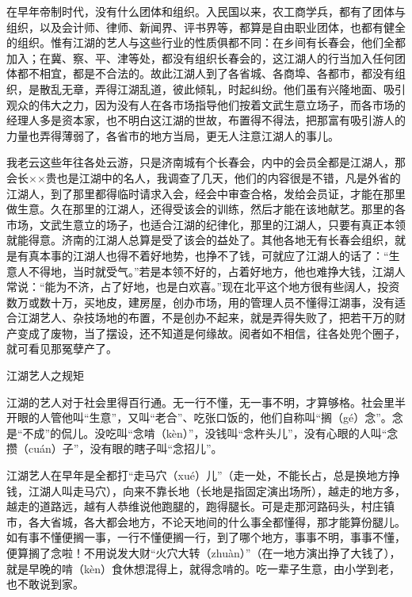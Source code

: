 \documentclass[12pt,UTF8]{ctexbook}
\begin{document}
在早年帝制时代，没有什么团体和组织。入民国以来，农工商学兵，都有了团体与组织，以及会计师、律师、新闻界、评书界等，都算是自由职业团体，也都有健全的组织。惟有江湖的艺人与这些行业的性质俱都不同：在乡间有长春会，他们全都加入；在冀、察、平、津等处，都没有组织长春会的，这江湖人的行当加入任何团体都不相宜，都是不合法的。故此江湖人到了各省城、各商埠、各都市，都没有组织，是散乱无章，弄得江湖乱道，彼此倾轧，时起纠纷。他们虽有兴隆地面、吸引观众的伟大之力，因为没有人在各市场指导他们按着文武生意立场子，而各市场的经理人多是资本家，也不明白这江湖的世故，布置得不得法，把那富有吸引游人的力量也弄得薄弱了，各省市的地方当局，更无人注意江湖人的事儿。

我老云这些年往各处云游，只是济南城有个长春会，内中的会员全都是江湖人，那会长××贵也是江湖中的名人，我调查了几天，他们的内容很是不错，凡是外省的江湖人，到了那里都得临时请求入会，经会中审查合格，发给会员证，才能在那里做生意。久在那里的江湖人，还得受该会的训练，然后才能在该地献艺。那里的各市场，文武生意立的场子，也适合江湖的纪律化，那里的江湖人，只要有真正本领就能得意。济南的江湖人总算是受了该会的益处了。其他各地无有长春会组织，就是有真本事的江湖人也得不着好地势，也挣不了钱，可就应了江湖人的话了：“生意人不得地，当时就受气。”若是本领不好的，占着好地方，他也难挣大钱，江湖人常说：“能为不济，占了好地，也是白欢喜。”现在北平这个地方很有些阔人，投资数万或数十万，买地皮，建房屋，创办市场，用的管理人员不懂得江湖事，没有适合江湖艺人、杂技场地的布置，不是创办不起来，就是弄得失败了，把若干万的财产变成了废物，当了摆设，还不知道是何缘故。阅者如不相信，往各处兜个圈子，就可看见那冤孽产了。





江湖艺人之规矩


江湖的艺人对于社会里得百行通。无一行不懂，无一事不明，才算够格。社会里半开眼的人管他叫“生意”，又叫“老合”、吃张口饭的，他们自称叫“搁（gé）念”。念是“不成”的侃儿。没吃叫“念啃（kèn）”，没钱叫“念杵头儿”，没有心眼的人叫“念攒（cuán）子”，没有眼的瞎子叫“念招儿”。

江湖艺人在早年是全都打“走马穴（xué）儿”（走一处，不能长占，总是换地方挣钱，江湖人叫走马穴），向来不靠长地（长地是指固定演出场所），越走的地方多，越走的道路远，越有人恭维说他跑腿的，跑得腿长。可是走那河路码头，村庄镇市，各大省城，各大都会地方，不论天地间的什么事全都懂得，那才能算份腿儿。如有事不懂便搁一事，一行不懂便搁一行，到了哪个地方，事事不明，事事不懂，便算搁了念啦！不用说发大财“火穴大转（zhuàn）”（在一地方演出挣了大钱了），就是早晚的啃（kèn）食休想混得上，就得念啃的。吃一辈子生意，由小学到老，也不敢说到家。
\end{document}

